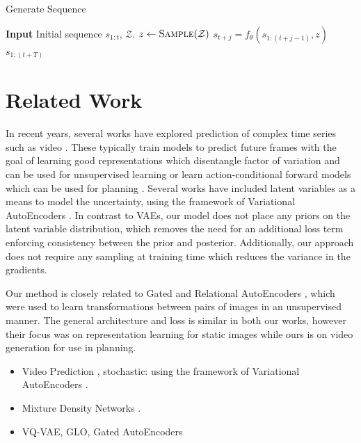 \documentclass{article}
\begin{document}
\begin{algorithm}[t]
  \caption{Generate Sequence}\label{algo-gen}
  \begin{algorithmic}[1]
    \State \textbf{Input} Initial sequence $s_{1:t}$, $\mathcal{Z}$.
    \State $z \gets \textsc{Sample}(\mathcal{Z})$
    \State $s_{t+j} = f_\theta(s_{1:(t+j-1)}, z)$
    \EndFor
    \Return $s_{1:(t+T)}$
  \end{algorithmic}
\end{algorithm}



\section{Related Work}

In recent years, several works have explored prediction of complex time series such as video \citep{mathieu-iclr-2016,canziani2017cortexnet}.
These typically train models to predict future frames with the goal of learning good representations which disentangle factor of variation and can be used for unsupervised learning \citep{Srivastava15, Villegas17, DentonB17} or learn action-conditional forward models which can be used for planning \citep{Oh15, FinnGL16, Poke, VideoPixel}.
Several works have included latent variables as a means to model the uncertainty, using the framework of Variational AutoEncoders \citep{Babaeizadeh2018, Denton2018}.
In contrast to VAEs, our model does not place any priors on the latent variable distribution, which removes the need for an additional loss term enforcing consistency between the prior and posterior.
Additionally, our approach does not require any sampling at training time which reduces the variance in the gradients.

Our method is closely related to Gated and Relational AutoEncoders \citep{RelationalAE, GAE}, which were used to learn transformations between pairs of images in an unsupervised manner.
The general architecture and loss is similar in both our works, however their focus was on representation learning for static images while ours is on video generation for use in planning.

\begin{itemize}
\item Video Prediction \citep{mathieu-iclr-2016}, stochastic:  using the framework of Variational AutoEncoders \citep{VAE}.
\item Mixture Density Networks \citep{mixture-density-networks}.
\item VQ-VAE, GLO, Gated AutoEncoders
\end{itemize}
\end{document}
